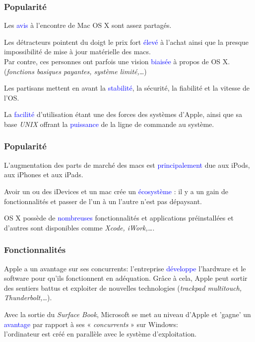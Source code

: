 \documentclass[aspectratio=169]{beamer}
\begin{document}
\begin{frame}
  \frametitle{Popularité}
  Les \textcolor{blue}{avis} à l’encontre de Mac OS X sont assez partagés.

  \hspace{0.5cm}

  Les détracteurs pointent du doigt le prix fort \textcolor{blue}{élevé} à
  l’achat ainsi que la presque impossibilité de mise à jour matérielle des
  macs. \\
  Par contre, ces personnes ont parfois une vision \textcolor{blue}{biaisée} à
  propos de OS X. (\textit{fonctions basiques payantes, système limité,…})

  \hspace{0.5cm}

  Les partisans mettent en avant la \textcolor{blue}{stabilité}, la sécurité,
  la fiabilité et la vitesse de l’OS.

  \hspace{0.5cm}

  La \textcolor{blue}{facilité} d’utilisation étant une des forces des systèmes
  d’Apple, ainsi que sa base \textit{UNIX} offrant la \textcolor{blue}{puissance} de la
  ligne de commande au système.
\end{frame}

\begin{frame}
  \frametitle{Popularité}

  L’augmentation des parts de marché des macs est
  \textcolor{blue}{principalement} due aux iPods, aux iPhones et aux iPads.

  \hspace{0.5cm}

  Avoir un ou des iDevices et un mac crée un \textcolor{blue}{écosystème} : il
  y a un gain de fonctionnalités et passer de l’un à un l’autre n'est pas
  dépaysant.

  \hspace{0.5cm}

  OS X possède de \textcolor{blue}{nombreuses} fonctionnalités et applications préinstallées et
  d'autres sont disponibles comme \textit{Xcode, iWork,…}.
\end{frame}

\begin{frame}
  \frametitle{Fonctionnalités}
  Apple a un avantage sur ses concurrents: l'entreprise
  \textcolor{blue}{développe} l'hardware et le software pour qu'ils
  fonctionnent en adéquation. Grâce à cela, Apple peut sortir des sentiers
  battus et exploiter de nouvelles technologies (\textit{trackpad multitouch,
    Thunderbolt,…}).

  \hspace{0.5cm}

  Avec la sortie du \textit{Surface Book}, Microsoft se met au niveau d'Apple
  et 'gagne' un \textcolor{blue}{avantage} par rapport à ses «
  \textit{concurrents} » sur Windows: \\ l'ordinateur est créé en parallèle
  avec le système d'exploitation.
\end{frame}
\end{document}
